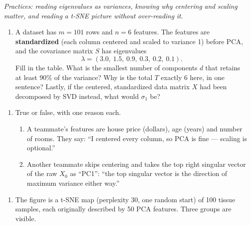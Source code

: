 \documentclass[
  11pt,
]{article}
\providecommand{\tightlist}{%
  \setlength{\itemsep}{0pt}\setlength{\parskip}{0pt}}
\newcommand{\answerspace}[1]{\par\vspace*{#1}}  %
\begin{document}
\emph{Practices: reading eigenvalues as variances, knowing why centering
and scaling matter, and reading a t-SNE picture without over-reading
it.}

\begin{enumerate}
\def\labelenumi{(\alph{enumi})}
\tightlist
\item
  A dataset has \(m = 101\) rows and \(n = 6\) features. The features
  are \textbf{standardized} (each column centered and scaled to variance
  1) before PCA, and the covariance matrix \(S\) has eigenvalues \[
  \lambda = (3.0,\ 1.5,\ 0.9,\ 0.3,\ 0.2,\ 0.1).
  \] Fill in the table. What is the smallest number of components \(d\)
  that retains at least \(90\%\) of the variance? Why is the total \(T\)
  exactly \(6\) here, in one sentence? Lastly, if the centered,
  standardized data matrix \(X\) had been decomposed by SVD instead,
  what would \(\sigma_1\) be?
\end{enumerate}

\answerspace{1.3in}

\begin{enumerate}
\def\labelenumi{(\alph{enumi})}
\setcounter{enumi}{1}
\item
  True or false, with one reason each.

  \begin{enumerate}
  \def\labelenumii{(\roman{enumii})}
  \item
    A teammate's features are house price (dollars), age (years) and
    number of rooms. They say: ``I centered every column, so PCA is fine
    --- scaling is optional.''
  \item
    Another teammate skips centering and takes the top right singular
    vector of the raw \(X_0\) as ``PC1'': ``the top singular vector is
    the direction of maximum variance either way.''
  \end{enumerate}
\end{enumerate}

\answerspace{1.8in}

\begin{enumerate}
\def\labelenumi{(\alph{enumi})}
\setcounter{enumi}{2}
\tightlist
\item
  The figure is a t-SNE map (perplexity 30, one random start) of 100
  tissue samples, each originally described by 50 PCA features. Three
  groups are visible.
\end{enumerate}
\end{document}
